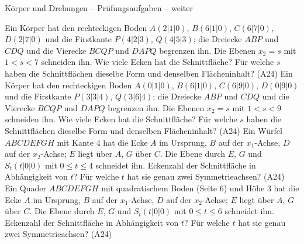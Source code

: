 \begin{aufgabe}{Körper und Drehungen – Prüfungsaufgaben – weiter}
\begin{teile}
\teil Ein Körper hat den rechteckigen Boden $A(2 | 1 | 0)$, $B(6 | 1 | 0)$, $C(6 | 7 | 0)$, $D(2 | 7 | 0)$ und die Firstkante $P(4 | 2 | 3)$, $Q(4 | 5 | 3)$; die Dreiecke $ABP$ und $CDQ$ und die Vierecke $BCQP$ und $DAPQ$ begrenzen ihn. Die Ebenen $x_2 = s$ mit $1 < s < 7$ schneiden ihn. Wie viele Ecken hat die Schnittfläche? Für welche $s$ haben die Schnittflächen dieselbe Form und denselben Flächeninhalt? \hfill (A24)
\teil Ein Körper hat den rechteckigen Boden $A(0 | 1 | 0)$, $B(6 | 1 | 0)$, $C(6 | 9 | 0)$, $D(0 | 9 | 0)$ und die Firstkante $P(3 | 3 | 4)$, $Q(3 | 6 | 4)$; die Dreiecke $ABP$ und $CDQ$ und die Vierecke $BCQP$ und $DAPQ$ begrenzen ihn. Die Ebenen $x_2 = s$ mit $1 < s < 9$ schneiden ihn. Wie viele Ecken hat die Schnittfläche? Für welche $s$ haben die Schnittflächen dieselbe Form und denselben Flächeninhalt? \hfill (A24)
\teil Ein Würfel $ABCDEFGH$ mit Kante $4$ hat die Ecke $A$ im Ursprung, $B$ auf der $x_1$-Achse, $D$ auf der $x_2$-Achse; $E$ liegt über $A$, $G$ über $C$. Die Ebene durch $E$, $G$ und $S_t(t | 0 | 0)$ mit $0 \le t \le 4$ schneidet ihn. Eckenzahl der Schnittfläche in Abhängigkeit von $t$? Für welche $t$ hat sie genau zwei Symmetrieachsen? \hfill (A24)
\teil Ein Quader $ABCDEFGH$ mit quadratischem Boden (Seite $6$) und Höhe $3$ hat die Ecke $A$ im Ursprung, $B$ auf der $x_1$-Achse, $D$ auf der $x_2$-Achse; $E$ liegt über $A$, $G$ über $C$. Die Ebene durch $E$, $G$ und $S_t(t | 0 | 0)$ mit $0 \le t \le 6$ schneidet ihn. Eckenzahl der Schnittfläche in Abhängigkeit von $t$? Für welche $t$ hat sie genau zwei Symmetrieachsen? \hfill (A24)
\end{teile}
\end{aufgabe}

\medskip
{}
